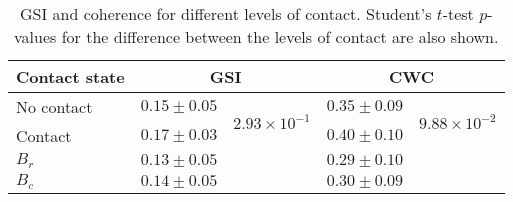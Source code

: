 \begin{table}
\centering
\caption{GSI and coherence for different levels of contact. Student's $t$-test $p$-values for the difference between the levels of contact are also shown.}
\label{tab:sync_stats_contact}
\begin{tabular}{lcccc}
\toprule
Contact state & \multicolumn{2}{c}{GSI} & \multicolumn{2}{c}{CWC} \\
\midrule
No contact & $0.15 \pm 0.05$ & \multirow{2}{*}{$2.93 \times 10^{-1}$} &$0.35 \pm 0.09$ & \multirow{2}{*}{$9.88 \times 10^{-2}$}  \\
Contact & $0.17 \pm 0.03$ & &$0.40 \pm 0.10$ & \\
\midrule
$B_r$ & $0.13 \pm 0.05$ & & $0.29 \pm 0.10$ & \\
$B_c$ & $0.14 \pm 0.05$ & & $0.30 \pm 0.09$ & \\
\bottomrule
\end{tabular}
\end{table}
